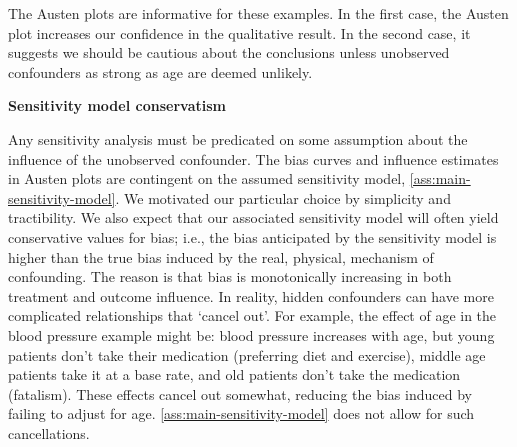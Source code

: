 \documentclass{article}
\DeclareRobustCommand{\parhead}[1]{\textbf{#1}~}
\begin{document}
The Austen plots are informative for these examples.
In the first case, the Austen plot increases our confidence in the qualitative result.
In the second case, it suggests we should be cautious about the conclusions unless unobserved confounders as strong as age are deemed unlikely.

%
%
%
%
%
%
%

\parhead{Sensitivity model conservatism}
\begin{table}[t]
  \caption{The sensitivity model tends to be conservative in its bias estimates.
    Bias estimates for leaving out a confounding covariate are computed
    according to the sensitivity model (using the left-out covariate data)
    and by comparing non-parametric effect estimates from the full data ($\tau_x$),
    and the left-out covariate data ($\tau_{x\exclude z}$). In all cases,
    the sensitivity model estimate is larger.
  }\label{tb:cons-bias}
  \begin{center}
  \end{center}
  \vspace{-18pt}
\end{table}
Any sensitivity analysis must be predicated on some assumption about the influence of the unobserved confounder.
The bias curves and influence estimates in Austen plots are contingent on the assumed sensitivity model, \cref{ass:main-sensitivity-model}.
We motivated our particular choice by simplicity and tractibility.
We also expect that our associated sensitivity model will often yield conservative values for bias; i.e., the bias anticipated by the sensitivity model is higher than the true bias induced by the real, physical, mechanism of confounding.
The reason is that bias is monotonically increasing in both treatment and outcome influence.
In reality, hidden confounders can have more complicated relationships that `cancel out'.
For example, the effect of age in the blood pressure example might be: blood pressure increases with age, but young patients don't take their medication (preferring diet and exercise), middle age patients take it at a base rate, and old patients don't take the medication (fatalism).
%
These effects cancel out somewhat, reducing the bias induced by failing to adjust for age. \cref{ass:main-sensitivity-model} does not allow for such cancellations.
\end{document}
